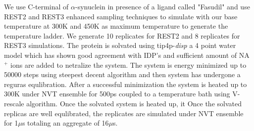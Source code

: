 We use C-terminal of $\alpha$-synuclein in presence of a ligand called "Fasudil" and use REST2 and REST3 enhanced sampling techniques to simulate with our base temperature at 300K and 450K as maximum temperature to generate the temperature ladder.
We generate 10 replicates for REST2 and 8 replicates for REST3 simulations.
The protein is solvated using tip4p-\textit{disp} a 4 point water model which has shown good agreement with IDP's and sufficient amount of NA$^{+}$ ions are added to netralize the system.
The system is energy minimized up to 50000 steps using steepest decent algorithm and then system has undergone a reguras equlibration.
After a successful minimization the system is heated up to 300K under NVT ensemble for 500ps coupled to a temperature bath using V-rescale algorithm.
Once the solvated system is heated up, it  
Once the solvated replicas are well equlibrated, the replicates are simulated under NVT ensemble for 1$\mu$s totaling an aggregate of 16$\mu$s.

